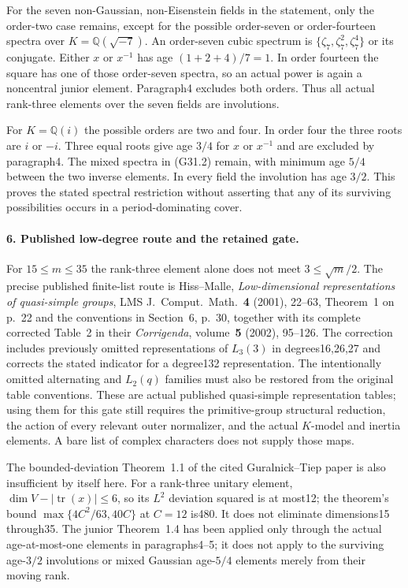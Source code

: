 For the seven non-Gaussian, non-Eisenstein fields in the statement,
only the order-two case remains, except for the possible
order-seven or order-fourteen spectra over $K=\mathbb Q(\sqrt{-7})$.
An order-seven cubic spectrum is
$\{\zeta_7,\zeta_7^2,\zeta_7^4\}$ or its conjugate.
Either $x$ or $x^{-1}$ has age $(1+2+4)/7=1$.
In order fourteen the square has one of those order-seven
spectra, so an actual power is again a noncentral junior element.
Paragraph4 excludes both orders.  Thus all actual rank-three
elements over the seven fields are involutions.

For $K=\mathbb Q(i)$ the possible orders are two and four.
In order four the three roots are $i$ or $-i$.  Three equal
roots give age $3/4$ for $x$ or $x^{-1}$ and are excluded by
paragraph4.  The mixed spectra in (G31.2) remain, with minimum
age $5/4$ between the two inverse elements.  In every field
the involution has age $3/2$.  This proves the stated spectral
restriction without asserting that any of its surviving
possibilities occurs in a period-dominating cover.

\paragraph{6. Published low-degree route and the retained gate.}
For $15\le m\le35$ the rank-three element alone does not meet
$3\le\sqrt m/2$.  The precise published finite-list route is
Hiss--Malle, \emph{Low-dimensional representations of
quasi-simple groups}, LMS J.~Comput.~Math.~\textbf{4} (2001),
22--63, Theorem~1 on p.~22 and the conventions in Section~6, p.~30,
together with its complete corrected Table~2 in their
\emph{Corrigenda}, volume~\textbf{5} (2002), 95--126.
The correction includes previously omitted representations of
$L_3(3)$ in degrees16,26,27 and corrects the stated indicator
for a degree132 representation.  The intentionally omitted
alternating and $L_2(q)$ families must also be restored from
the original table conventions.  These are actual published
quasi-simple representation tables; using them for this gate
still requires the primitive-group structural reduction,
the action of every relevant outer normalizer, and the actual
$K$-model and inertia elements.  A bare list of complex
characters does not supply those maps.

The bounded-deviation Theorem~1.1 of the cited Guralnick--Tiep
paper is also insufficient by itself here.  For a rank-three
unitary element, $\dim V-|\operatorname{tr}(x)|\le6$,
so its $L^2$ deviation squared is at most12; the theorem's
bound $\max\{4C^2/63,40C\}$ at $C=12$ is480.
It does not eliminate dimensions15 through35.  The junior
Theorem~1.4 has been applied only through the actual
age-at-most-one elements in paragraphs4--5; it does not apply
to the surviving age-$3/2$ involutions or mixed Gaussian
age-$5/4$ elements merely from their moving rank.


